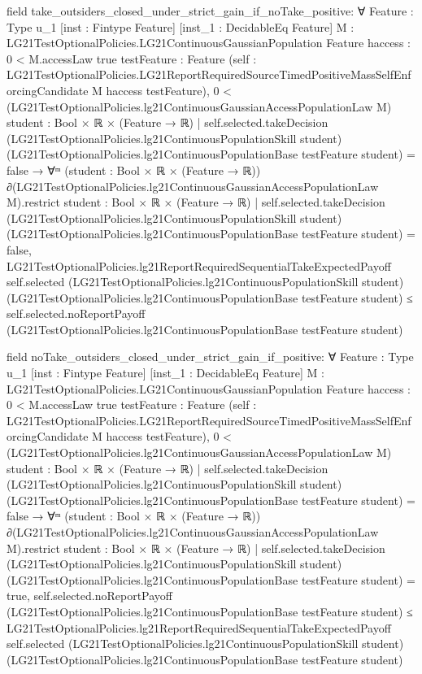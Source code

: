 \documentclass[10pt]{article}
\begin{document}
\begin{ReviewVerbatim}
field take_outsiders_closed_under_strict_gain_if_noTake_positive:
∀ {Feature : Type u_1} [inst : Fintype Feature] [inst_1 : DecidableEq Feature]
  {M : LG21TestOptionalPolicies.LG21ContinuousGaussianPopulation Feature} {haccess : 0 < M.accessLaw {true}}
  {testFeature : Feature}
  (self :
    LG21TestOptionalPolicies.LG21ReportRequiredSourceTimedPositiveMassSelfEnforcingCandidate M haccess testFeature),
  0 <
      (LG21TestOptionalPolicies.lg21ContinuousGaussianAccessPopulationLaw M)
        {student : Bool × ℝ × (Feature → ℝ) |
          self.selected.takeDecision (LG21TestOptionalPolicies.lg21ContinuousPopulationSkill student)
              (LG21TestOptionalPolicies.lg21ContinuousPopulationBase testFeature student) =
            false} →
    ∀ᵐ (student :
      Bool ×
        ℝ ×
          (Feature →
            ℝ)) ∂(LG21TestOptionalPolicies.lg21ContinuousGaussianAccessPopulationLaw M).restrict
        {student : Bool × ℝ × (Feature → ℝ) |
          self.selected.takeDecision (LG21TestOptionalPolicies.lg21ContinuousPopulationSkill student)
              (LG21TestOptionalPolicies.lg21ContinuousPopulationBase testFeature student) =
            false},
      LG21TestOptionalPolicies.lg21ReportRequiredSequentialTakeExpectedPayoff self.selected
          (LG21TestOptionalPolicies.lg21ContinuousPopulationSkill student)
          (LG21TestOptionalPolicies.lg21ContinuousPopulationBase testFeature student) ≤
        self.selected.noReportPayoff (LG21TestOptionalPolicies.lg21ContinuousPopulationBase testFeature student)

field noTake_outsiders_closed_under_strict_gain_if_positive:
∀ {Feature : Type u_1} [inst : Fintype Feature] [inst_1 : DecidableEq Feature]
  {M : LG21TestOptionalPolicies.LG21ContinuousGaussianPopulation Feature} {haccess : 0 < M.accessLaw {true}}
  {testFeature : Feature}
  (self :
    LG21TestOptionalPolicies.LG21ReportRequiredSourceTimedPositiveMassSelfEnforcingCandidate M haccess testFeature),
  0 <
      (LG21TestOptionalPolicies.lg21ContinuousGaussianAccessPopulationLaw M)
        {student : Bool × ℝ × (Feature → ℝ) |
          self.selected.takeDecision (LG21TestOptionalPolicies.lg21ContinuousPopulationSkill student)
              (LG21TestOptionalPolicies.lg21ContinuousPopulationBase testFeature student) =
            false} →
    ∀ᵐ (student :
      Bool ×
        ℝ ×
          (Feature →
            ℝ)) ∂(LG21TestOptionalPolicies.lg21ContinuousGaussianAccessPopulationLaw M).restrict
        {student : Bool × ℝ × (Feature → ℝ) |
          self.selected.takeDecision (LG21TestOptionalPolicies.lg21ContinuousPopulationSkill student)
              (LG21TestOptionalPolicies.lg21ContinuousPopulationBase testFeature student) =
            true},
      self.selected.noReportPayoff (LG21TestOptionalPolicies.lg21ContinuousPopulationBase testFeature student) ≤
        LG21TestOptionalPolicies.lg21ReportRequiredSequentialTakeExpectedPayoff self.selected
          (LG21TestOptionalPolicies.lg21ContinuousPopulationSkill student)
          (LG21TestOptionalPolicies.lg21ContinuousPopulationBase testFeature student)
\end{ReviewVerbatim}
\end{document}
